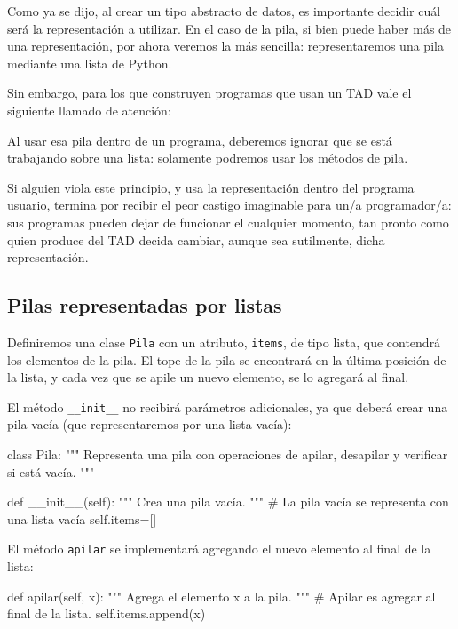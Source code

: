 Como ya se dijo, al crear un tipo abstracto de datos, es importante decidir
cuál será la representación a utilizar.  En el caso de la pila, si bien puede
haber más de una representación, por ahora veremos la más sencilla:
representaremos una pila mediante una lista de Python.

Sin embargo, para los que construyen programas que usan un TAD vale el
siguiente llamado de atención:

\begin{atencion}
Al usar esa pila dentro de un programa, deberemos ignorar que se está
trabajando sobre una lista: solamente podremos usar los métodos de pila.

Si alguien viola este principio, y usa la representación dentro del
programa usuario, termina por recibir el peor castigo imaginable para un/a
programador/a: sus programas pueden dejar de funcionar el cualquier
momento, tan pronto como quien produce del TAD decida cambiar, aunque sea
sutilmente, dicha representación.
\end{atencion}

\subsection{Pilas representadas por listas}

Definiremos una clase \lstinline!Pila! con un atributo, \lstinline!items!,
de tipo lista, que contendrá los elementos de la pila. El tope de la pila
se encontrará en la última posición de la lista, y cada vez que se apile un
nuevo elemento, se lo agregará al final.

El método \lstinline+__init__+ no recibirá parámetros adicionales, ya que
deberá crear una pila vacía (que representaremos por una lista vacía):

\begin{codigo-python-sn}
class Pila:
    """ Representa una pila con operaciones de apilar, desapilar y
        verificar si está vacía. """

    def __init__(self):
        """ Crea una pila vacía. """
        # La pila vacía se representa con una lista vacía
        self.items=[]
\end{codigo-python-sn}

El método \lstinline!apilar! se implementará agregando el nuevo elemento al
final de la lista:

\begin{codigo-python-sn}
    def apilar(self, x):
        """ Agrega el elemento x a la pila. """
        # Apilar es agregar al final de la lista.
        self.items.append(x)
\end{codigo-python-sn}

